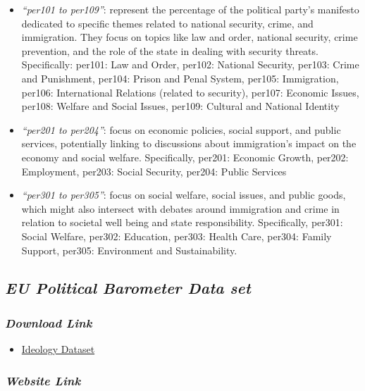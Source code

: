 \documentclass[
]{article}
\providecommand{\tightlist}{%
  \setlength{\itemsep}{0pt}\setlength{\parskip}{0pt}}\usepackage{longtable,booktabs,array}
\begin{document}
\begin{itemize}
\tightlist
\item
  \emph{``per101 to per109''}: represent the percentage of the political
  party's manifesto dedicated to specific themes related to national
  security, crime, and immigration. They focus on topics like law and
  order, national security, crime prevention, and the role of the state
  in dealing with security threats. Specifically: per101: Law and Order,
  per102: National Security, per103: Crime and Punishment, per104:
  Prison and Penal System, per105: Immigration, per106: International
  Relations (related to security), per107: Economic Issues, per108:
  Welfare and Social Issues, per109: Cultural and National Identity
\item
  \emph{``per201 to per204''}: focus on economic policies, social
  support, and public services, potentially linking to discussions about
  immigration's impact on the economy and social welfare. Specifically,
  per201: Economic Growth, per202: Employment, per203: Social Security,
  per204: Public Services
\item
  \emph{``per301 to per305''}: focus on social welfare, social issues,
  and public goods, which might also intersect with debates around
  immigration and crime in relation to societal well being and state
  responsibility. Specifically, per301: Social Welfare, per302:
  Education, per303: Health Care, per304: Family Support, per305:
  Environment and Sustainability.
\end{itemize}

\subsection{\texorpdfstring{\emph{EU Political Barometer Data
set}}{EU Political Barometer Data set}}\label{eu-political-barometer-data-set}

\subsubsection{\texorpdfstring{\emph{Download
Link}}{Download Link}}\label{download-link-3}

\begin{itemize}
\tightlist
\item
  \href{https://eupoliticalbarometer.uc3m.es/api/ideologyDownload}{Ideology
  Dataset}
\end{itemize}

\subsubsection{\texorpdfstring{\emph{Website
Link}}{Website Link}}\label{website-link-3}
\end{document}
